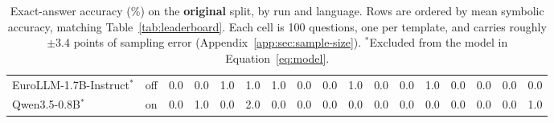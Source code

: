\begin{table}
{\begin{tabular}{llrrrrrrrrrrrrrrr}
EuroLLM-1.7B-Instruct$^{*}$ & off & 0.0 & 0.0 & 1.0 & 1.0 & 1.0 & 0.0 & 0.0 & 1.0 & 0.0 & 0.0 & 1.0 & 0.0 & 0.0 & 0.0 & 0.0 \\
Qwen3.5-0.8B$^{*}$ & on & 0.0 & 1.0 & 0.0 & 2.0 & 0.0 & 0.0 & 0.0 & 0.0 & 0.0 & 0.0 & 0.0 & 0.0 & 0.0 & 0.0 & 1.0 \\
\bottomrule
\end{tabular}}
\caption{Exact-answer accuracy (\%) on the \textbf{original} split, by run and language. Rows are ordered by mean symbolic accuracy, matching Table~\ref{tab:leaderboard}. Each cell is 100 questions, one per template, and carries roughly $\pm 3.4$ points of sampling error (Appendix~\ref{app:sec:sample-size}). $^{*}$Excluded from the model in Equation~\ref{eq:model}.}
\label{tab:by-language-original}
\end{table}

